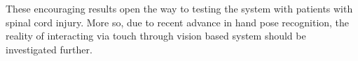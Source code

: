 \documentclass{chi-ext}
\begin{document}
These encouraging results open the way to testing the system with patients with spinal cord injury. More so, due to recent advance in hand pose recognition, the reality of interacting via touch through vision based system should be investigated further.



\newpage

\balance


\end{document}
